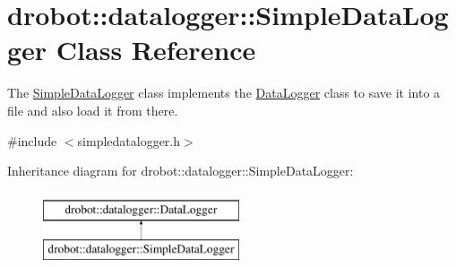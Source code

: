 \hypertarget{classdrobot_1_1datalogger_1_1SimpleDataLogger}{\section{drobot\-:\-:datalogger\-:\-:Simple\-Data\-Logger Class Reference}
\label{classdrobot_1_1datalogger_1_1SimpleDataLogger}
}


The \hyperlink{classdrobot_1_1datalogger_1_1SimpleDataLogger}{Simple\-Data\-Logger} class implements the \hyperlink{classdrobot_1_1datalogger_1_1DataLogger}{Data\-Logger} class to save it into a file and also load it from there.  




{\ttfamily \#include $<$simpledatalogger.\-h$>$}

Inheritance diagram for drobot\-:\-:datalogger\-:\-:Simple\-Data\-Logger\-:\begin{figure}[H]
\begin{center}
\leavevmode
\includegraphics[height=2.000000cm]{classdrobot_1_1datalogger_1_1SimpleDataLogger}
\end{center}
\end{figure}
